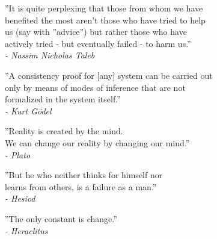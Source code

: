 \begin{flushright}
''It is quite perplexing that those from whom we have\\
benefited the most aren’t those who have tried to help\\
us (say with ''advice'') but rather those who have\\
actively tried - but eventually failed - to harm us.''\\

\textit{- Nassim Nicholas Taleb}
\end{flushright}

\begin{flushright}
''A consistency proof for [any] system can be carried out\\
only by means of modes of inference that are not\\
formalized in the system itself.''\\

\textit{- Kurt Gödel}
\end{flushright}

\begin{flushright}
''Reality is created by the mind.\\
We can change our reality by changing our mind.''\\

\textit{- Plato}
\end{flushright}

\begin{flushright}
''But he who neither thinks for himself nor\\
learns from others, is a failure as a man.''\\

\textit{- Hesiod}
\end{flushright}

\begin{flushright}
''The only constant is change.''\\

\textit{- Heraclitus}
\end{flushright}